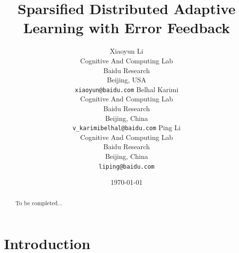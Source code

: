 \documentclass[11pt]{article}
\begin{document}
\title{Sparsified Distributed Adaptive Learning with Error Feedback}

\author{
Xiaoyun Li \\
  Cognitive And Computing Lab\\
  Baidu Research\\
  Beijing, USA \\
  \texttt{xiaoyun@baidu.com} 
   \And
  Belhal Karimi \\
  Cognitive And Computing Lab\\
  Baidu Research\\
  Beijing, China \\
  \texttt{v_karimibelhal@baidu.com} 
   \And
  Ping Li \\
  Cognitive And Computing Lab\\
  Baidu Research\\
  Beijing, China \\
  \texttt{liping@baidu.com} \\
}

\date{\today}

\maketitle

\begin{abstract}
To be completed...
\end{abstract}

\section{Introduction}\label{sec:introduction}
\end{document}
